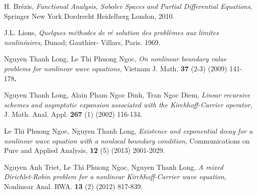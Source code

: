 \documentclass[12pt,a4paper]{article}
\theoremstyle{definition}
\theoremstyle{definition}
\begin{document}
\begin{thebibliography}{1}
 H. Brézis, \textit{Functional Analysis, Sobolev Spaces
and Partial Differential Equations}, Springer New York Dordrecht Heidelberg
London, 2010.

 J.L. Lions, \textit{Quelques m\'{e}thodes de r\'{e}%
solution des probl\`{e}mes aux limites nonlin\'{e}aires}, Dunod; Gauthier-
Villars, Paris. 1969.

 Nguyen Thanh Long, Le Thi Phuong Ngoc, \textit{On nonlinear
boundary value problems for nonlinear wave equations}, Vietnam J. Math. 
\textbf{37 }(2-3) (2009) 141-178\textbf{.}

 Nguyen Thanh Long, Alain Pham Ngoc Dinh, Tran Ngoc Diem, 
\textit{Linear recursive schemes and asymptotic expansion associated with
the Kirchhoff-Carrier operator}, J. Math. Anal. Appl. \textbf{267} (1)
(2002) 116-134.

 Le Thi Phuong Ngoc, Nguyen Thanh Long,
\textit{Existence and exponential decay for a nonlinear wave equation with 
a nonlocal boundary condition}, Communications on Pure and Applied Analysis,
\textbf{12} (5) (2013) 2001-2029.

 Nguyen Anh Triet, Le Thi Phuong Ngoc, Nguyen Thanh Long, 
\textit{A mixed Dirichlet-Robin problem for a nonlinear Kirchhoff-Carrier
wave equation}, Nonlinear Anal. RWA. \textbf{13} (2) (2012) 817-839.
\end{thebibliography}
\end{document}
